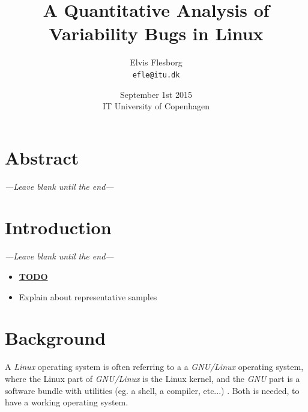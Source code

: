 \documentclass[a4paper,11pt]{article}
\begin{document}
\setlength{\parindent}{0cm}
\setlength{\unitlength}{1mm}

\date{September 1st 2015\\ IT University of Copenhagen}
\title{A Quantitative Analysis of Variability Bugs in Linux}
\author{Elvis Flesborg\\
\texttt{efle@itu.dk}}
\clearpage\maketitle
\thispagestyle{empty}
\newpage

\tableofcontents
\thispagestyle{empty}



\newpage

\setcounter{page}{1}

\section{Abstract}
\emph{---Leave blank until the end---}

\section{Introduction}
\emph{---Leave blank until the end---}


\begin{itemize}
    \item \underline{\textbf{TODO}}
        \item Explain about representative samples
\end{itemize}


\newpage
        \section{Background}

A \emph{Linux} operating system is often referring to a a \emph{GNU/Linux} 
operating system, where the Linux part of \emph{GNU/Linux} is the Linux kernel, 
and the \emph{GNU} part is a software bundle with utilities (eg. a shell, a 
compiler, etc...) \cite{gnu_pack}. Both is 
needed, to have a working operating system. 
\\
\end{document}
